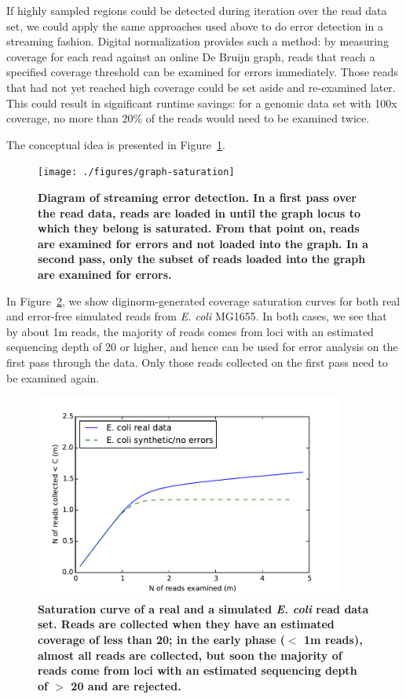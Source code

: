 \documentclass{article}
\begin{document}
If highly sampled regions could be detected during iteration over the
read data set, we could apply the same approaches used above to do
error detection in a streaming fashion.  Digital normalization
provides such a method: by measuring coverage for each read against an
online De Bruijn graph, reads that reach a specified coverage
threshold can be examined for errors immediately.  Those reads that
had not yet reached high coverage could be set aside and re-examined
later.  This could result in significant runtime savings: for a
genomic data set with 100x coverage, no more than 20\% of the reads
would need to be examined twice.

The conceptual idea is presented in Figure~\ref{fig:concept}.

\begin{figure}[!ht]
 \centerline{\texttt{[image: ./figures/graph-saturation]}}
\caption{\bf Diagram of streaming error detection. In a first pass
over the read data, reads are loaded in until the graph locus to which
they belong is saturated.  From that point on, reads are examined for
errors and not loaded into the graph.  In a second pass, only the subset
of reads loaded into the graph are examined for errors.}
\label{fig:concept}
\end{figure}

In Figure~\ref{fig:saturation}, we show diginorm-generated coverage
saturation curves for both real and error-free simulated reads from
{\em E. coli} MG1655.  In both cases, we see that by about 1m reads,
the majority of reads comes from loci with an estimated sequencing
depth of 20 or higher, and hence can be used for error analysis on the
first pass through the data.  Only those reads collected on the first
pass need to be examined again.

\begin{figure}[!ht]
 \centerline{\includegraphics[width=4in]{./figures/saturation}}
\caption{\bf Saturation curve of a real and a simulated {\em E. coli} read data
set.  Reads are collected when they have an estimated coverage of less
than 20; in the early phase ($<$ 1m reads), almost all reads are
collected, but soon the majority of reads come from loci with an estimated
sequencing depth of $>$ 20 and are rejected.}
\label{fig:saturation}
\end{figure}
\end{document}
